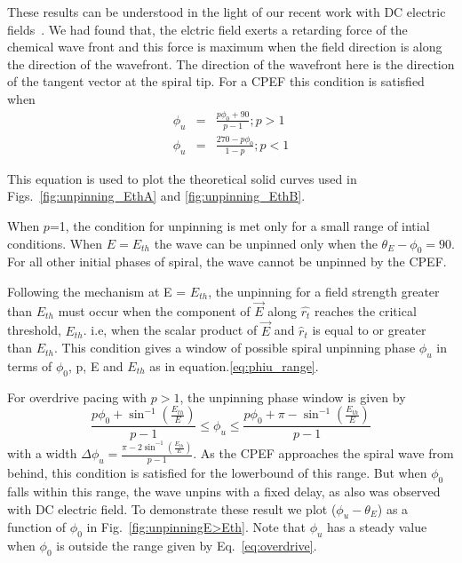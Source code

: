 These results can be understood in the light of our recent work with DC
electric fields~\cite{Amrutha}. We had found that, the elctric field exerts a
retarding force of the chemical wave front and this force is maximum when the
field direction is along the direction of the wavefront. The direction of the
wavefront here is the direction of the tangent vector at the spiral tip. For a
CPEF this condition is satisfied when 
\begin{eqnarray}
	\phi_u &=& \frac{p \phi_0+ 90}{p-1} ; p>1 \\
	\phi_u &=& \frac{270-p \phi_0}{1-p} ; p<1  
\label{eq:Eth}
\end{eqnarray}

This equation is used to plot the theoretical solid curves used in Figs.~\ref{fig:unpinning_EthA} and
\ref{fig:unpinning_EthB}.   

When $p$=1, the condition for unpinning is met only for a small range of intial
conditions. When $E=E_{th}$ the wave can be unpinned only when the
$\theta_E-\phi_0 = 90$. For all other initial phases of spiral, the wave cannot
be unpinned by the CPEF.  

Following the mechanism at E = $E_{th}$, the unpinning for a field strength
greater than $E_{th}$ must occur when the component of $\vec{E}$ along
$\hat{r_t}$ reaches the critical threshold, $E_{th}$. i.e, when the scalar
product of ${\vec{E}}$ and ${\hat{r}}_{t}$ is equal to or greater than
$E_{th}$. This condition gives a window of possible spiral unpinning phase
$\phi_{u}$ in terms of $\phi_{0}$, p, E and $E_{th}$ as in
equation.\ref{eq:phiu_range}.

For overdrive pacing with $p>1$, the unpinning phase window is given by
\begin{equation}
\frac{p \phi_0+ {\sin^{-1}}(\frac{E_{th}}{E})}{p-1}   \leq \phi_u \leq \frac{p \phi_0+\pi -{\sin^{-1}}(\frac{E_{th}}{E})}{p-1}
\label{eq:overdrive}
\end{equation}
with a width $\Delta\phi_u = \frac{\pi - 2 \sin^{-1}(\frac{E_{th}}{E})}{p-1}$.
As the CPEF approaches the spiral wave from behind, this condition is satisfied for the lowerbound of this range. But when $\phi_0$ falls within this range, the wave unpins with a fixed delay, as also was observed with DC electric field. To demonstrate these result we plot ($\phi_u-\theta_E$) as a function of $\phi_0$ in Fig.~\ref{fig:unpinningE>Eth}. Note that $\phi_u$ has a steady value when $\phi_0$ is outside the range given by Eq.~\ref{eq:overdrive}.

